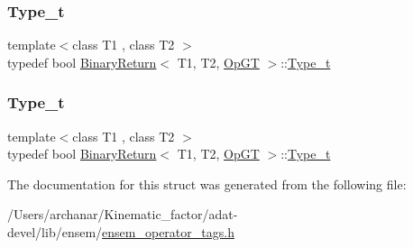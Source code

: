 \mbox{\label{structBinaryReturn_3_01T1_00_01T2_00_01OpGT_01_4_ac4478a3194da16a795fb10b5a100ff48}} 
\subsubsection{\texorpdfstring{Type\_t}{Type\_t}\hspace{0.1cm}{\footnotesize\ttfamily [2/3]}}
{\footnotesize\ttfamily template$<$class T1 , class T2 $>$ \\
typedef bool \mbox{\hyperlink{structBinaryReturn}{Binary\+Return}}$<$ T1, T2, \mbox{\hyperlink{structOpGT}{Op\+GT}} $>$\+::\mbox{\hyperlink{structBinaryReturn_3_01T1_00_01T2_00_01OpGT_01_4_ac4478a3194da16a795fb10b5a100ff48}{Type\+\_\+t}}}

\mbox{\label{structBinaryReturn_3_01T1_00_01T2_00_01OpGT_01_4_ac4478a3194da16a795fb10b5a100ff48}} 
\subsubsection{\texorpdfstring{Type\_t}{Type\_t}\hspace{0.1cm}{\footnotesize\ttfamily [3/3]}}
{\footnotesize\ttfamily template$<$class T1 , class T2 $>$ \\
typedef bool \mbox{\hyperlink{structBinaryReturn}{Binary\+Return}}$<$ T1, T2, \mbox{\hyperlink{structOpGT}{Op\+GT}} $>$\+::\mbox{\hyperlink{structBinaryReturn_3_01T1_00_01T2_00_01OpGT_01_4_ac4478a3194da16a795fb10b5a100ff48}{Type\+\_\+t}}}



The documentation for this struct was generated from the following file\+:\begin{DoxyCompactItemize}
\item 
/\+Users/archanar/\+Kinematic\+\_\+factor/adat-\/devel/lib/ensem/\mbox{\hyperlink{adat-devel_2lib_2ensem_2ensem__operator__tags_8h}{ensem\+\_\+operator\+\_\+tags.\+h}}\end{DoxyCompactItemize}
